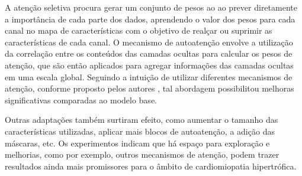 A atenção seletiva procura gerar um conjunto de pesos ao ao prever diretamente a importância de cada parte dos dados, aprendendo o valor dos pesos para cada canal no mapa de características com o objetivo de realçar ou suprimir as características de cada canal. O mecanismo de autoatenção envolve a utilização da correlação entre os conteúdos das camadas ocultas para calcular os pesos de atenção, que são então aplicados para agregar informações das camadas ocultas em uma escala global. Seguindo a intuição de utilizar diferentes mecanismos de atenção, conforme proposto pelos autores \cite{yangNeuralNetworkDesign2024a}, tal abordagem possibilitou melhoras significativas comparadas ao modelo base. 

Outras adaptações também surtiram efeito, como aumentar o tamanho das características utilizadas, aplicar mais blocos de autoatenção, a adição das máscaras, etc. Os experimentos indicam que há espaço para exploração e melhorias, como por exemplo, outros mecanismos de atenção, podem trazer resultados ainda mais promissores para o âmbito de cardiomiopatia hipertrófica. 


